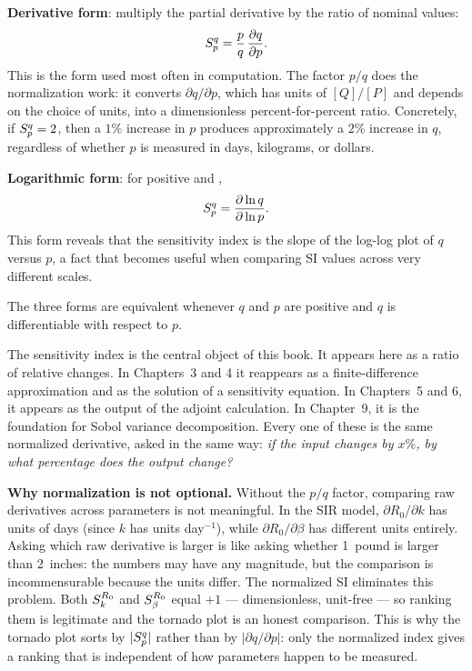 \textbf{Derivative form}: multiply the partial derivative by the
ratio of nominal values:
\begin{equation}
  S_{p}^{q} = \frac{p}{q}\,\frac{\partial q}{\partial p}.
  \label{eq:SIderiv}
\end{equation}
This is the form used most often in computation.
The factor $p/q$ does the normalization work: it converts
$\partial q/\partial p$, which has units of $[Q]/[P]$ and depends
on the choice of units, into a dimensionless percent-for-percent ratio.
Concretely, if $S_{p}^{q} = 2$, then a $1\%$ increase in $p$
produces approximately a $2\%$ increase in $q$,
regardless of whether $p$ is measured in days, kilograms, or dollars.

\textbf{Logarithmic form}: for positive \POIs and \QOIs,
\begin{equation}
  S_{p}^{q} = \frac{\partial \ln q}{\partial \ln p}.
  \label{eq:SIlog}
\end{equation}
This form reveals that the sensitivity index is the slope of the
log-log plot of $q$ versus $p$, a fact that becomes useful
when comparing SI values across very different scales.

The three forms are equivalent whenever $q$ and $p$ are
positive and $q$ is differentiable with respect to $p$.

 The sensitivity index is the central object of this book.
It appears here as a ratio of relative changes. In Chapters~3 and 4
it reappears as a finite-difference approximation and as the solution
of a sensitivity equation. In Chapters~5 and 6, it appears as the
output of the adjoint calculation. In Chapter~9, it is the foundation
for Sobol variance decomposition. Every one of these is the same
normalized derivative, asked in the same way:
\emph{if the input changes by $x\%$, by what percentage does the output change?}

\medskip
\noindent\textbf{Why normalization is not optional.}
Without the $p/q$ factor, comparing raw derivatives across parameters
is not meaningful.
In the SIR model, $\partial R_0/\partial k$ has units of days
(since $k$ has units day$^{-1}$), while $\partial R_0/\partial \beta$
has different units entirely.
Asking which raw derivative is larger is like asking whether
1~pound is larger than 2~inches: the numbers may have any magnitude,
but the comparison is incommensurable because the units differ.
The normalized SI eliminates this problem.
Both $S_{k}^{R_0}$ and $S_{\beta}^{R_0}$ equal $+1$ --- dimensionless,
unit-free --- so ranking them is legitimate and the tornado plot
is an honest comparison.
This is why the tornado plot sorts by $|S_{p}^{q}|$ rather than
by $|\partial q/\partial p|$: only the normalized index gives
a ranking that is independent of how parameters happen to be measured.

